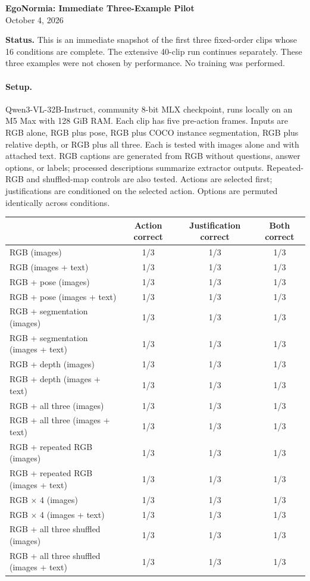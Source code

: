 \documentclass[10pt]{article}
\begin{document}
\fontsize{9.5}{11}\selectfont
\begin{center}{\Large\bfseries EgoNormia: Immediate Three-Example Pilot}\\[5pt]October 4, 2026\end{center}
\noindent\textbf{Status.} This is an immediate snapshot of the first three fixed-order clips whose 16 conditions are complete. The extensive 40-clip run continues separately. These three examples were not chosen by performance. No training was performed.
\paragraph{Setup.} Qwen3-VL-32B-Instruct, community 8-bit MLX checkpoint, runs locally on an M5 Max with 128 GiB RAM. Each clip has five pre-action frames. Inputs are RGB alone, RGB plus pose, RGB plus COCO instance segmentation, RGB plus relative depth, or RGB plus all three. Each is tested with images alone and with attached text. RGB captions are generated from RGB without questions, answer options, or labels; processed descriptions summarize extractor outputs. Repeated-RGB and shuffled-map controls are also tested. Actions are selected first; justifications are conditioned on the selected action. Options are permuted identically across conditions.
\begin{center}\small
\begin{tabular}{lccc}
 & Action correct & Justification correct & Both correct\\\hline
RGB (images) & 1/3 & 1/3 & 1/3\\
RGB (images + text) & 1/3 & 1/3 & 1/3\\
RGB + pose (images) & 1/3 & 1/3 & 1/3\\
RGB + pose (images + text) & 1/3 & 1/3 & 1/3\\
RGB + segmentation (images) & 1/3 & 1/3 & 1/3\\
RGB + segmentation (images + text) & 1/3 & 1/3 & 1/3\\
RGB + depth (images) & 1/3 & 1/3 & 1/3\\
RGB + depth (images + text) & 1/3 & 1/3 & 1/3\\
RGB + all three (images) & 1/3 & 1/3 & 1/3\\
RGB + all three (images + text) & 1/3 & 1/3 & 1/3\\
RGB + repeated RGB (images) & 1/3 & 1/3 & 1/3\\
RGB + repeated RGB (images + text) & 1/3 & 1/3 & 1/3\\
RGB $\times$ 4 (images) & 1/3 & 1/3 & 1/3\\
RGB $\times$ 4 (images + text) & 1/3 & 1/3 & 1/3\\
RGB + all three shuffled (images) & 1/3 & 1/3 & 1/3\\
RGB + all three shuffled (images + text) & 1/3 & 1/3 & 1/3\\
\end{tabular}\end{center}
\end{document}
